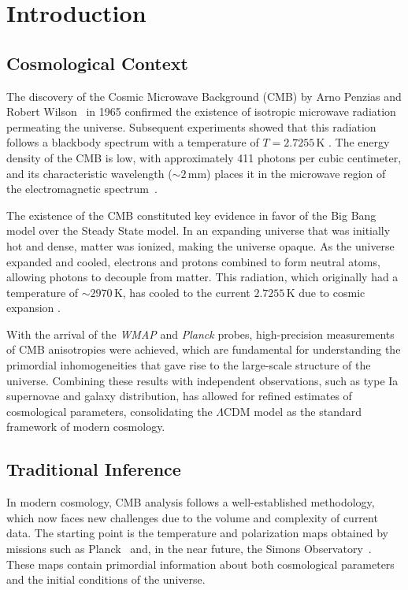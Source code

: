 \section{Introduction}
\subsection{Cosmological Context}
The discovery of the Cosmic Microwave Background (CMB) by Arno Penzias and Robert Wilson~\cite{penzias} in 1965 confirmed the existence of isotropic microwave radiation permeating the universe. Subsequent experiments showed that this radiation follows a blackbody spectrum with a temperature of \( T = 2.7255 \, \text{K} \) \cite{ryden}. The energy density of the CMB is low, with approximately 411 photons per cubic centimeter, and its characteristic wavelength (\(\sim 2\,\mathrm{mm}\)) places it in the microwave region of the electromagnetic spectrum~\cite{ryden}.

The existence of the CMB constituted key evidence in favor of the Big Bang model over the Steady State model. In an expanding universe that was initially hot and dense, matter was ionized, making the universe opaque. As the universe expanded and cooled, electrons and protons combined to form neutral atoms, allowing photons to decouple from matter. This radiation, which originally had a temperature of \(\sim 2970 \, \text{K}\), has cooled to the current \(2.7255 \, \text{K}\) due to cosmic expansion \cite{ryden}.

With the arrival of the \textit{WMAP} and \textit{Planck} probes, high-precision measurements of CMB anisotropies were achieved, which are fundamental for understanding the primordial inhomogeneities that gave rise to the large-scale structure of the universe. Combining these results with independent observations, such as type Ia supernovae and galaxy distribution, has allowed for refined estimates of cosmological parameters, consolidating the \(\Lambda\)CDM model as the standard framework of modern cosmology.

\subsection{Traditional Inference}
In modern cosmology, CMB analysis follows a well-established methodology, which now faces new challenges due to the volume and complexity of current data. The starting point is the temperature and polarization maps obtained by missions such as Planck~\cite{planck2018} and, in the near future, the Simons Observatory~\cite{simons2019}. These maps contain primordial information about both cosmological parameters and the initial conditions of the universe.


